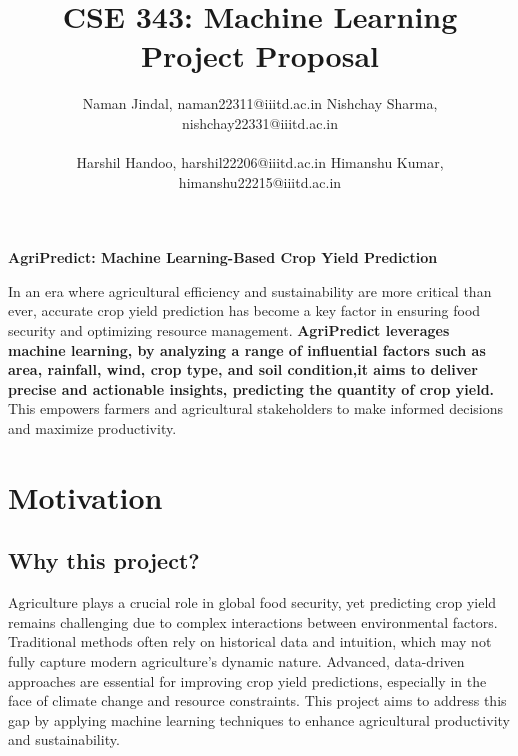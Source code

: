 \documentclass[10pt,twocolumn,letterpaper]{article}
\begin{document}
\title{\vspace{-5em}  CSE 343: Machine Learning Project Proposal \\ \vspace{-0.5em}}
\author{
Naman Jindal, naman22311@iiitd.ac.in \hspace{2em} %
Nishchay Sharma, nishchay22331@iiitd.ac.in \\
\vspace{0.3em} \\ %
Harshil Handoo, harshil22206@iiitd.ac.in \hspace{2em} %
Himanshu Kumar, himanshu22215@iiitd.ac.in
}

\maketitle

\begin{center}
    {\bf\LARGE AgriPredict: Machine Learning-Based Crop Yield Prediction}
\end{center}
\vspace{0 in} %


     In an era where agricultural efficiency and sustainability are more critical than ever, accurate crop yield prediction has become a key factor in ensuring food security and optimizing resource management. \textbf{AgriPredict leverages machine learning, by analyzing a range of influential factors such as area, rainfall, wind, crop type, and soil condition,it aims to deliver precise and actionable insights, predicting the quantity of crop yield.} This empowers farmers and agricultural stakeholders to make informed decisions and maximize productivity.



\section{Motivation}

\subsection{Why this project?}

Agriculture plays a crucial role in global food security, yet predicting crop yield remains challenging due to complex interactions between environmental factors. Traditional methods often rely on historical data and intuition, which may not fully capture modern agriculture's dynamic nature. Advanced, data-driven approaches are essential for improving crop yield predictions, especially in the face of climate change and resource constraints. This project aims to address this gap by applying machine learning techniques to enhance agricultural productivity and sustainability.
\end{document}
